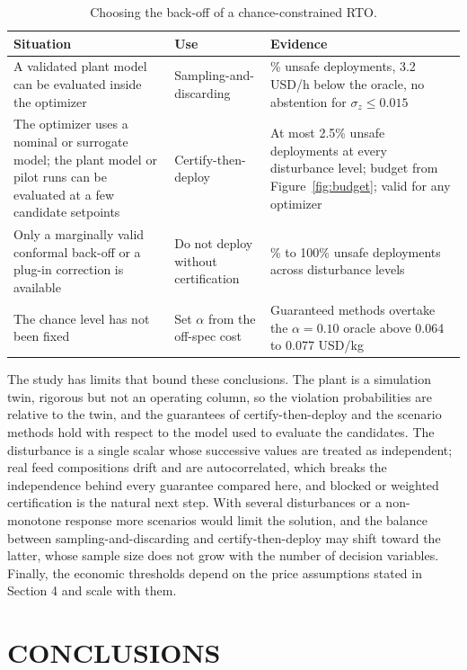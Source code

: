 \documentclass[12pt]{article}
\begin{document}
\begin{table}[t]
\centering
\caption{Choosing the back-off of a chance-constrained RTO.}
\label{tab:guide}
\small
\begin{tabular}{@{}>{\raggedright}p{}>{\raggedright}p{}>{\raggedright\arraybackslash}p{}@{}}
\toprule
\textbf{Situation} & \textbf{Use} & \textbf{Evidence} \\
\midrule
A validated plant model can be evaluated inside the optimizer & Sampling-and-discarding &
0.0\% unsafe deployments, 3.2 USD/h below the oracle, no abstention for $\sigma_z \le 0.015$ \\
The optimizer uses a nominal or surrogate model; the plant model or pilot runs can be evaluated at a
few candidate setpoints & Certify-then-deploy & At most 2.5\% unsafe deployments at every
disturbance level; budget from Figure~\ref{fig:budget}; valid for any optimizer \\
Only a marginally valid conformal back-off or a plug-in correction is available & Do not deploy
without certification & 12.0\% to 100\% unsafe deployments across disturbance levels \\
The chance level has not been fixed & Set $\alpha$ from the off-spec cost & Guaranteed methods
overtake the $\alpha=0.10$ oracle above 0.064 to 0.077 USD/kg \\
\bottomrule
\end{tabular}
\end{table}

The study has limits that bound these conclusions. The plant is a simulation twin, rigorous but not
an operating column, so the violation probabilities are relative to the twin, and the guarantees
of certify-then-deploy and the scenario methods hold with respect to the model used to evaluate
the candidates. The disturbance is a single scalar whose successive values are treated as
independent; real feed compositions drift and are autocorrelated, which breaks the independence
behind every guarantee compared here, and blocked or weighted certification is the natural next
step. With several disturbances or a non-monotone response more scenarios would limit the solution,
and the balance between sampling-and-discarding and certify-then-deploy may shift toward the latter,
whose sample size does not grow with the number of decision variables. Finally, the economic
thresholds depend on the price assumptions stated in Section 4 and scale with them.

\section{CONCLUSIONS}
\end{document}
